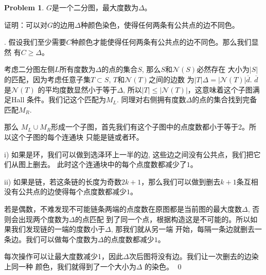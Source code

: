 \documentclass[UTF8]{ctexart}
\newenvironment{sol}
  {\par\vspace{3mm}\noindent{\it Solution}.}
  {\qed \\ \medskip}
\theoremstyle{definition}
\newtheorem{problem}{Problem}
\begin{document}
\begin{problem}
$G$是一个二分图，最大度数为$\Delta$。

证明：可以对$G$的边用$\Delta$种颜色染色，使得任何两条有公共点的边不同色。

\begin{sol}
  假设我们至少需要$C$种颜色才能使得任何两条有公共点的边不同色。那么我们显然
  有$C \geq \Delta$。

  考虑二分图左侧$L$所有度数为$\Delta$的点的集合$S$, 那么$S$和$\mathcal{N}(S)$必然存在
  大小为$|S|$的匹配，因为考虑任意子集$T \subset S$, $T$和$\mathcal{N}(T)$之间的边数
  为$|T|\Delta = |\mathcal{N}(T)|\overline{d}$. $\overline{d}$ 是$\mathcal{N}(T)$
  的平均度数显然小于等于$\Delta$, 所以$|T| \leq |\mathcal{N}(T)|$，这意味着这个子图满足Hall
  条件。我们记这个匹配为$M_L$. 同理对右侧拥有度数$\Delta$的点的集合找到完备匹配$M_R$.

  那么 $M_L \cup M_R$形成一个子图，首先我们有这个子图中的点度数都小于等于2。所以这个子图的每个连通块
  只能是链或者环。  

  i) 如果是环，我们可以做到选泽环上一半的边, 这些边之间没有公共点，我们把它们从图上删去。
  此时这个连通块中的每个点度数都减少了$1$。

  ii) 如果是链，若这条链的长度为奇数$2k+1$，那么我们可以做到删去$k+1$条互相没有公共点的边使得每个点度数都减少$1$。
  
  若是偶数，不难发现不可能链条两端的点度数在原图都是当前图的最大度数$\Delta$, 否则会出现两个度数为$\Delta$的点匹配
  到了同一个点，根据构造这是不可能的。所以如果我们发现链的一端的度数小于$\Delta$, 那我们就从另一端
  开始，每隔一条边就删去一条边。我们可以做每个度数为$\Delta$的点度数都减少$1$。

  每次操作可以让最大度数减少1，因此$\Delta$次后图将没有边。我们让一次删去的边染上同一种
  颜色，我们就得到了一个大小为$\Delta$ 的染色。
\end{sol}
\end{problem}
\end{document}
